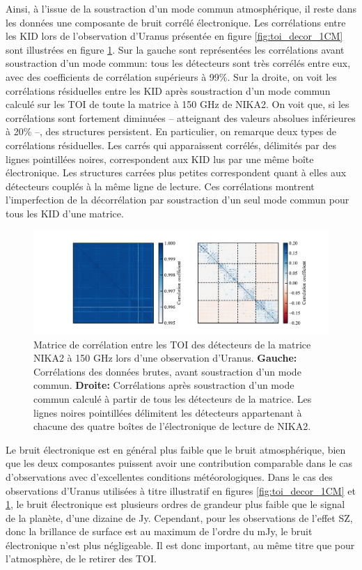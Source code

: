 Ainsi, à l'issue de la soustraction d'un mode commun atmosphérique, il reste dans les données une composante de bruit corrélé électronique.
Les corrélations entre les KID lors de l'observation d'Uranus présentée en figure \ref{fig:toi_decor_1CM} sont illustrées en figure \ref{fig:toi_corr}.
Sur la gauche sont représentées les corrélations avant soustraction d'un mode commun: tous les détecteurs sont très corrélés entre eux, avec des coefficients de corrélation supérieurs à 99\%.
Sur la droite, on voit les corrélations résiduelles entre les KID après soustraction d'un mode commun calculé sur les TOI de toute la matrice à 150 GHz de NIKA2.
On voit que, si les corrélations sont fortement diminuées -- atteignant des valeurs absolues inférieures à 20\% --, des structures persistent.
En particulier, on remarque deux types de corrélations résiduelles.
Les carrés qui apparaissent corrélés, délimités par des lignes pointillées noires, correspondent aux KID lus par une même boîte électronique.
Les structures carrées plus petites correspondent quant à elles aux détecteurs couplés à la même ligne de lecture.
Ces corrélations montrent l'imperfection de la décorrélation par soustraction d'un seul mode commun pour tous les KID d'une matrice.

\begin{figure}[t]
    \centering
    \includegraphics[width=\linewidth, trim={2.3cm .5cm 1.5cm .5cm}, clip]{Figures/Chap_decor/toi_correlation.pdf}
    \caption{
        Matrice de corrélation entre les TOI des détecteurs de la matrice NIKA2 à 150 GHz lors d'une observation d'Uranus.
        \textbf{Gauche:} Corrélations des données brutes, avant soustraction d'un mode commun.
        \textbf{Droite:} Corrélations après soustraction d'un mode commun calculé à partir de tous les détecteurs de la matrice.
        Les lignes noires pointillées délimitent les détecteurs appartenant à chacune des quatre boîtes de l'électronique de lecture de NIKA2.
    }
    \label{fig:toi_corr}
\end{figure}

Le bruit électronique est en général plus faible que le bruit atmosphérique, bien que les deux composantes puissent avoir une contribution comparable dans le cas d'observations avec d'excellentes conditions météorologiques.
Dans le cas des observations d'Uranus utilisées à titre illustratif en figures \ref{fig:toi_decor_1CM} et \ref{fig:toi_corr}, le bruit électronique est plusieurs ordres de grandeur plus faible que le signal de la planète, d'une dizaine de Jy.
Cependant, pour les observations de l'effet SZ, donc la brillance de surface est au maximum de l'ordre du mJy, le bruit électronique n'est plus négligeable.
Il est donc important, au même titre que pour l'atmosphère, de le retirer des TOI.

